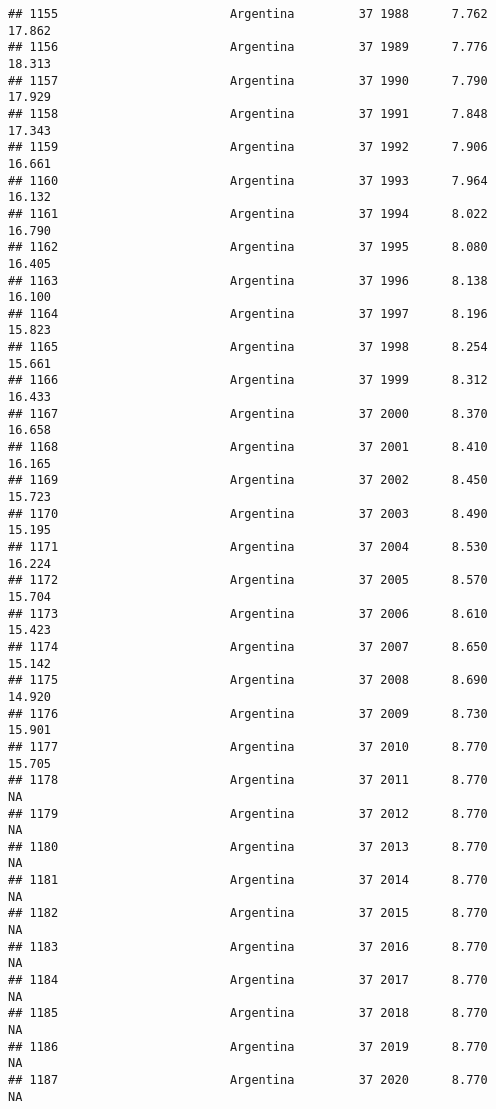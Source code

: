 \documentclass[
]{article}
\begin{document}
\begin{verbatim}
## 1155                        Argentina         37 1988      7.762     17.862
## 1156                        Argentina         37 1989      7.776     18.313
## 1157                        Argentina         37 1990      7.790     17.929
## 1158                        Argentina         37 1991      7.848     17.343
## 1159                        Argentina         37 1992      7.906     16.661
## 1160                        Argentina         37 1993      7.964     16.132
## 1161                        Argentina         37 1994      8.022     16.790
## 1162                        Argentina         37 1995      8.080     16.405
## 1163                        Argentina         37 1996      8.138     16.100
## 1164                        Argentina         37 1997      8.196     15.823
## 1165                        Argentina         37 1998      8.254     15.661
## 1166                        Argentina         37 1999      8.312     16.433
## 1167                        Argentina         37 2000      8.370     16.658
## 1168                        Argentina         37 2001      8.410     16.165
## 1169                        Argentina         37 2002      8.450     15.723
## 1170                        Argentina         37 2003      8.490     15.195
## 1171                        Argentina         37 2004      8.530     16.224
## 1172                        Argentina         37 2005      8.570     15.704
## 1173                        Argentina         37 2006      8.610     15.423
## 1174                        Argentina         37 2007      8.650     15.142
## 1175                        Argentina         37 2008      8.690     14.920
## 1176                        Argentina         37 2009      8.730     15.901
## 1177                        Argentina         37 2010      8.770     15.705
## 1178                        Argentina         37 2011      8.770         NA
## 1179                        Argentina         37 2012      8.770         NA
## 1180                        Argentina         37 2013      8.770         NA
## 1181                        Argentina         37 2014      8.770         NA
## 1182                        Argentina         37 2015      8.770         NA
## 1183                        Argentina         37 2016      8.770         NA
## 1184                        Argentina         37 2017      8.770         NA
## 1185                        Argentina         37 2018      8.770         NA
## 1186                        Argentina         37 2019      8.770         NA
## 1187                        Argentina         37 2020      8.770         NA

\end{verbatim}
\end{document}
